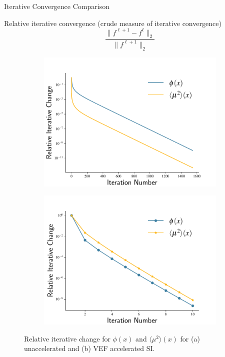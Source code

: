 \documentclass[10pt]{beamer}
\newcommand{\edd}{\langle \mu^2 \rangle}
\begin{document}
\begin{frame}{Iterative Convergence Comparison}

	Relative iterative convergence (crude measure of iterative convergence)
	\begin{equation*}
		\frac{\| f^{\ell+1} - f^\ell \|_2}{\| f^{\ell+1} \|_2}
	\end{equation*}

	\vspace{-.2in}
	\begin{figure}[htb]
	\centering
	\begin{subfigure}{.515\textwidth}
		\centering
		\includegraphics[width=\textwidth]{figs/si.pdf}
		\caption{}
		\label{fig:si}
	\end{subfigure}
	\hspace{-2em}
	\begin{subfigure}{.515\textwidth}
		\centering
		\includegraphics[width=\textwidth]{figs/vef.pdf}  
		\caption{}
		\label{fig:vef}
	\end{subfigure}
	\caption{Relative iterative change for $\phi(x)$ and $\edd(x)$ for (a) unaccelerated and (b) VEF accelerated SI. }
	\end{figure}

\end{frame}
\end{document}
